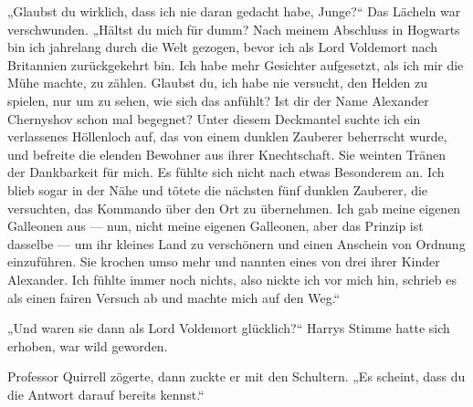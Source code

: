 „Glaubst du wirklich, dass ich nie daran gedacht habe, Junge?“
Das Lächeln war verschwunden.
„Hältst du mich für dumm? Nach meinem Abschluss in Hogwarts bin ich jahrelang durch die Welt gezogen, bevor ich als Lord Voldemort nach Britannien zurückgekehrt bin. Ich habe mehr Gesichter aufgesetzt, als ich mir die Mühe machte, zu zählen. Glaubst du, ich habe nie versucht, den Helden zu spielen, nur um zu sehen, wie sich das anfühlt? Ist dir der Name Alexander Chernyshov schon mal begegnet? Unter diesem Deckmantel suchte ich ein verlassenes Höllenloch auf, das von einem dunklen Zauberer beherrscht wurde, und befreite die elenden Bewohner aus ihrer Knechtschaft. Sie weinten Tränen der Dankbarkeit für mich. Es fühlte sich nicht nach etwas Besonderem an. Ich blieb sogar in der Nähe und tötete die nächsten fünf dunklen Zauberer, die versuchten, das Kommando über den Ort zu übernehmen. Ich gab meine eigenen Galleonen aus — nun, nicht meine eigenen Galleonen, aber das Prinzip ist dasselbe — um ihr kleines Land zu verschönern und einen Anschein von Ordnung einzuführen. Sie krochen umso mehr und nannten eines von drei ihrer Kinder Alexander. Ich fühlte immer noch nichts, also nickte ich vor mich hin, schrieb es als einen fairen Versuch ab und machte mich auf den Weg.“

„Und waren sie dann als Lord Voldemort glücklich?“
Harrys Stimme hatte sich erhoben, war wild geworden.

Professor Quirrell zögerte, dann zuckte er mit den Schultern.
„Es scheint, dass du die Antwort darauf bereits kennst.“

